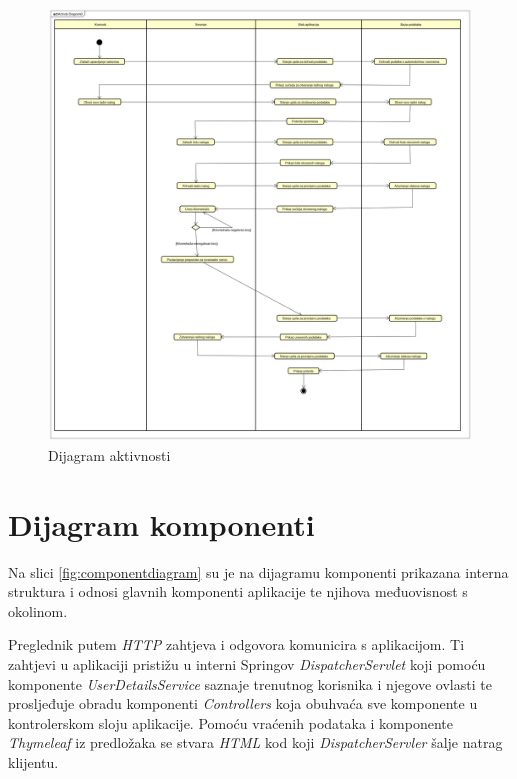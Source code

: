 			 \begin{figure}[H]
			 	\centering
			 	\includegraphics[width=1.0\linewidth]{dijagrami/activity-diagram-v2}
			 	\caption{Dijagram aktivnosti}
			 	\label{fig:actdiag}
			 \end{figure}
			
			\eject
		\section{Dijagram komponenti}
%		
%		
		
		Na slici \ref{fig:componentdiagram} su je na dijagramu komponenti prikazana interna struktura i odnosi glavnih komponenti aplikacije te njihova međuovisnost s okolinom.
		
		Preglednik putem \textit{HTTP} zahtjeva i odgovora komunicira s aplikacijom. Ti zahtjevi u aplikaciji pristižu u interni Springov \textit{DispatcherServlet} koji pomoću komponente \textit{UserDetailsService} saznaje trenutnog korisnika i njegove ovlasti te prosljeđuje obradu komponenti \textit{Controllers} koja obuhvaća sve komponente u kontrolerskom sloju aplikacije. Pomoću vraćenih podataka i komponente \textit{Thymeleaf} iz predložaka se stvara \textit{HTML} kod koji \textit{DispatcherServler} šalje natrag klijentu.
		
